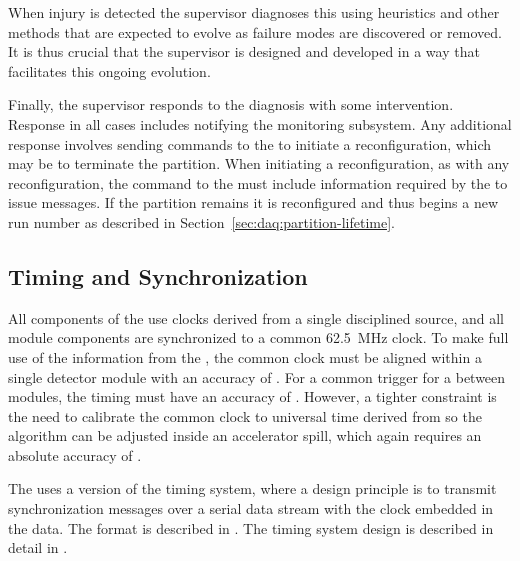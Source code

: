 When injury is detected the supervisor  diagnoses this using heuristics and other methods that are expected to evolve as failure modes are discovered or removed. 
It is thus crucial that the supervisor is designed and developed in a way that facilitates this ongoing evolution.  

Finally, the supervisor responds to the diagnosis with some intervention. 
Response  in all cases includes notifying the monitoring subsystem. 
Any additional response involves sending commands to the  to initiate a reconfiguration,  which may be to terminate the partition.
When initiating a reconfiguration, as with any reconfiguration, the command to the  must include information required by the  to issue  messages. 
If the partition remains it is reconfigured and thus begins a new run number as described in Section~\ref{sec:daq:partition-lifetime}.


\subsection{Timing and Synchronization}
\label{sec:sp-daq:design-timing}

All components of the  use clocks derived from a single
 disciplined source, and all module components are
synchronized to a common \SI{62.5}{MHz} clock. 
To make full use of the information from the , the common clock must be aligned within a single detector %
module with an accuracy of . 
For a common trigger for a  between modules, the timing must have an accuracy of .
However, a tighter constraint is the need to calibrate the common clock to universal time derived from  so the  algorithm can be adjusted inside an accelerator spill, which again requires an absolute accuracy of .

The   uses a version of the  timing
system, where a design principle is to transmit synchronization messages over
a serial data stream with the clock embedded in the data. The format
is described in . The timing system design is
described in detail in .

